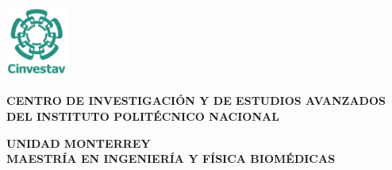 %


\begin{titlepage}
	\tgherosfont
	\centering
	
	\noindent
	\begin{minipage}[h]{0.05\textwidth}
		\hspace{-2cm} %
		\includegraphics[width=2cm]{gfx/logospng1.png}
	\end{minipage}%
	\begin{minipage}[h]{0.95\textwidth}
		\centering
		\large 
		\textbf{CENTRO DE INVESTIGACIÓN Y DE ESTUDIOS AVANZADOS DEL INSTITUTO POLITÉCNICO NACIONAL}
	\end{minipage}


	{\large \textbf{UNIDAD MONTERREY}} \\[4mm]
	{\large \textbf{MAESTRÍA EN INGENIERÍA Y FÍSICA BIOMÉDICAS}} \\[10mm]
	



\end{titlepage}
